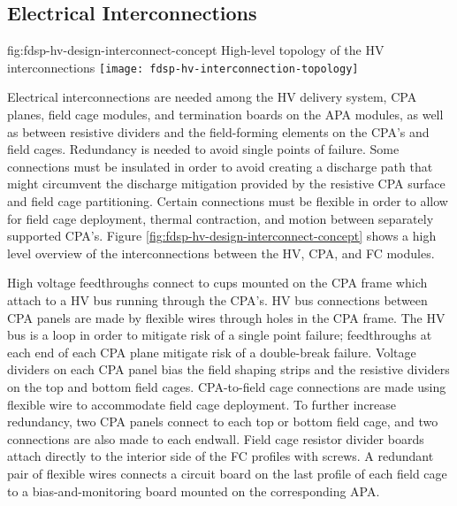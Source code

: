 \subsection{Electrical Interconnections} %
\label{sec:fdsp-hv-design-interconnect}

\begin{dunefigure}{fig:fdsp-hv-design-interconnect-concept}
  {High-level topology of the HV interconnections}
  \texttt{[image: fdsp-hv-interconnection-topology]}
\end{dunefigure}

Electrical interconnections are needed among the HV delivery system, CPA planes, field cage modules, and termination
boards on the APA modules, as well as between resistive dividers and
the field-forming elements on the CPA's and field cages.  Redundancy is
needed to avoid single points of failure. 
Some connections must be
insulated in order to avoid creating a discharge path that might
circumvent the discharge mitigation provided by the resistive CPA
surface and field cage partitioning.  Certain connections must be
flexible in order to allow for field cage deployment, thermal
contraction, and motion between separately supported CPA's.  Figure
\ref{fig:fdsp-hv-design-interconnect-concept} shows a high level
overview of the interconnections between the HV, CPA, and FC modules.


High voltage feedthroughs connect to cups mounted on the CPA frame
which attach to a HV bus running through the CPA's.  HV bus connections
between CPA panels are made by flexible wires through holes in the
CPA frame. The HV bus is a loop in order to mitigate risk of a single
point failure; feedthroughs at each end of each CPA plane mitigate
risk of a double-break failure.  Voltage dividers on each CPA panel
bias the field shaping strips and the resistive dividers on the top
and bottom field cages.  CPA-to-field cage connections are made using
flexible wire to accommodate field cage deployment.  To further
increase redundancy, two CPA panels connect to each top or bottom
field cage, and two connections are also made to each endwall.  Field
cage resistor divider boards attach directly to the interior side of
the FC profiles with screws.  A redundant pair of flexible wires
connects a circuit board on the last profile of each field cage to a
bias-and-monitoring board mounted on the corresponding APA.

